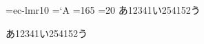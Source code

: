 \begingroup
\font\g=ec-lmr10\g
{}=`A\relax
{}=165\relax
{}=20\relax
\scrollmode
\expandafter\show\csname あ\kansuji12341い\kansuji254152う\endcsname

あ\kansuji12341い\kansuji254152う

\endgroup
\bye


